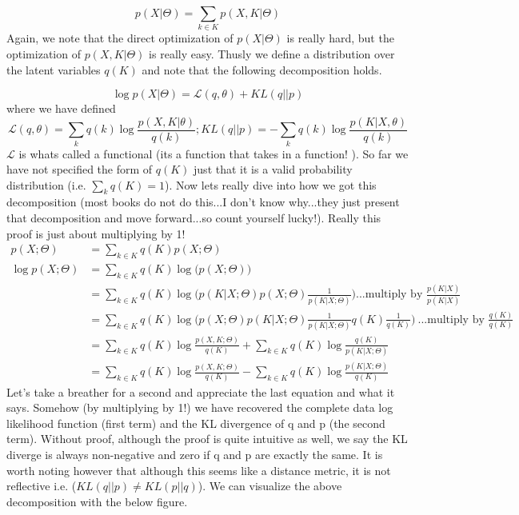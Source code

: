 \begin{equation}
p(X|\Theta) = \sum_{k\in K}p(X,K|\Theta)
\end{equation}
Again, we note that the direct optimization of $p(X|\Theta)$ is really hard, but the optimization of $p(X,K|\Theta)$ is really easy. Thusly we define a distribution over the latent variables $q(K)$ and note that the following decomposition holds.

\begin{equation}
\log p(X|\Theta) = \mathcal{L}(q,\theta) + KL(q||p)
\end{equation}
where we have defined 
\begin{equation}
\mathcal{L}(q,\theta) = \sum_kq(k)\log\frac{p(X,K|\theta)}{q(k)} ;
KL(q||p) 	= -\sum_k q(k)\log\frac{p(K|X, \theta)}{q(k)}
\end{equation}
$\mathcal{L}$ is whats called a functional (its a function that takes in a function! ). So far we have not specified the form of $q(K)$ just that it is a valid probability distribution (i.e. $\sum_kq(K) = 1$).
Now lets really dive into how we got this decomposition (most books do not do this...I don't know why...they just present that decomposition and move forward...so count yourself lucky!). Really this proof is just about multiplying by 1!
\begin{align}
p(X;\Theta)&= \sum_{k\in K}q(K)p(X;\Theta)\\
\log p(X;\Theta) &=\sum_{k\in K}q(K)\log\Big(p(X;\Theta)\Big)\\
&= \sum_{k\in K}q(K)\log\Big(p(K|X;\Theta)p(X;\Theta)\frac{1}{p(K|X;\Theta)}\Big)  \mbox{...multiply by $\frac{p(K|X)}{p(K|X)}$}\\  
&= \sum_{k\in K}q(K)\log\Big(p(X;\Theta)p(K|X;\Theta)\frac{1}{p(K|X;\Theta)} q(K)\frac{1}{q(K)}\Big)  \  \mbox{...multiply by $\frac{q(K)}{q(K)}$}\\  
&= \sum_{k\in K}q(K)\log\frac{p(X,K;\Theta)}{q(K)} + \sum_{k\in K}q(K)\log\frac{q(K)}{p(K|X;\Theta)} \\  
&= \sum_{k\in K}q(K)\log\frac{p(X,K;\Theta)}{q(K)} - \sum_{k\in K}q(K)\log\frac{p(K|X;\Theta)}{q(K)}  
\end{align}
Let's take a breather for a second and appreciate the last equation and what it says. Somehow (by multiplying by 1!) we have recovered the complete data log likelihood function (first term) and the KL divergence of q and p (the second term). Without proof, although the proof is quite intuitive as well, we say the KL diverge is always non-negative and zero if q and p are exactly the same. It is worth noting however that although this seems like a distance metric, it is not reflective i.e. ($KL(q||p) \neq KL(p||q)$). We can visualize the above decomposition with the below figure. 


